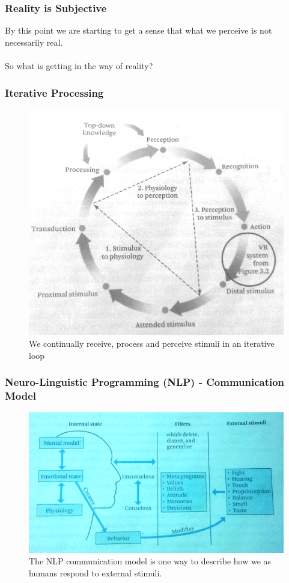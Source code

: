 \begin{frame}
	\frametitle{Reality is Subjective}
	By this point we are starting to get a sense that what we perceive is not necessarily real. \\~\\ \pause
	So what is getting in the way of reality? 
\end{frame}

\begin{frame}
	\frametitle{Iterative Processing}
	\begin{figure}
		 \includegraphics[scale=.1]{assets/iterative}
		 \caption{ We continually receive, process and perceive stimuli in an iterative loop}
		 
	\end{figure}
\end{frame}


\begin{frame}
	\frametitle{\tiny{Neuro-Linguistic Programming (NLP) - Communication Model}}
	\begin{figure}
		 \includegraphics[scale=.2]{assets/nlp}
		 \caption{The NLP communication model is one way to describe how we as humans respond to external stimuli.  }
		 
	\end{figure}
\end{frame}

